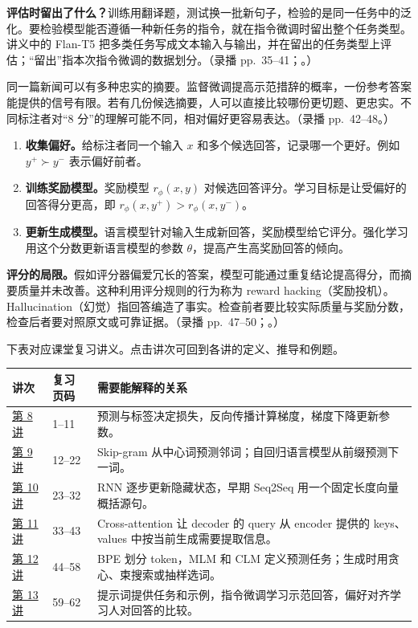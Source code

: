 \textbf{评估时留出了什么？}训练用翻译题，测试换一批新句子，检验的是同一任务中的泛化。要检验模型能否遵循一种新任务的指令，就在指令微调时留出整个任务类型。讲义中的 Flan-T5 把多类任务写成文本输入与输出，并在留出的任务类型上评估；“留出”指本次指令微调的数据划分。（录播 pp.~35--41；。）

同一篇新闻可以有多种忠实的摘要。监督微调提高示范措辞的概率，一份参考答案能提供的信号有限。若有几份候选摘要，人可以直接比较哪份更切题、更忠实。不同标注者对“8 分”的理解可能不同，相对偏好更容易表达。（录播 pp.~42--48。）

\begin{enumerate}
  \item \textbf{收集偏好。}给标注者同一个输入 $x$ 和多个候选回答，记录哪一个更好。例如 $y^+\succ y^-$ 表示偏好前者。
  \item \textbf{训练奖励模型。}奖励模型 $r_\phi(x,y)$ 对候选回答评分。学习目标是让受偏好的回答得分更高，即 $r_\phi(x,y^+)>r_\phi(x,y^-)$。
  \item \textbf{更新生成模型。}语言模型针对输入生成新回答，奖励模型给它评分。强化学习用这个分数更新语言模型的参数 $\theta$，提高产生高奖励回答的倾向。
\end{enumerate}

\textbf{评分的局限。}假如评分器偏爱冗长的答案，模型可能通过重复结论提高得分，而摘要质量并未改善。这种利用评分规则的行为称为 reward hacking（奖励投机）。Hallucination（幻觉）指回答编造了事实。检查前者要比较实际质量与奖励分数，检查后者要对照原文或可靠证据。（录播 pp.~47--50；。）

下表对应课堂复习讲义。点击讲次可回到各讲的定义、推导和例题。

\begin{center}
\small
\begin{tabularx}{\linewidth}{@{}llX@{}}
\toprule
讲次 & 复习页码 & 需要能解释的关系 \\
\midrule
\hyperref[lecture:SC4002-L08]{第 8 讲} & 1--11 & 预测与标签决定损失，反向传播计算梯度，梯度下降更新参数。\\
\hyperref[lecture:SC4002-L09]{第 9 讲} & 12--22 & Skip-gram 从中心词预测邻词；自回归语言模型从前缀预测下一词。\\
\hyperref[lecture:SC4002-L10]{第 10 讲} & 23--32 & RNN 逐步更新隐藏状态，早期 Seq2Seq 用一个固定长度向量概括源句。\\
\hyperref[lecture:SC4002-L11]{第 11 讲} & 33--43 & Cross-attention 让 decoder 的 query 从 encoder 提供的 keys、values 中按当前生成需要提取信息。\\
\hyperref[lecture:SC4002-L12]{第 12 讲} & 44--58 & BPE 划分 token，MLM 和 CLM 定义预测任务；生成时用贪心、束搜索或抽样选词。\\
\hyperref[lecture:SC4002-L13]{第 13 讲} & 59--62 & 提示词提供任务和示例，指令微调学习示范回答，偏好对齐学习人对回答的比较。\\
\bottomrule
\end{tabularx}
\end{center}

